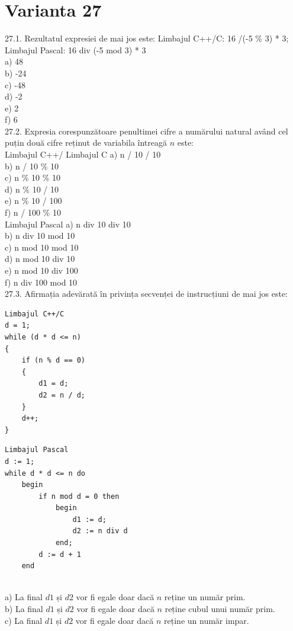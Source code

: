 \section*{Varianta 27}

27.1. Rezultatul expresiei de mai jos este: Limbajul C++/C: 16 /(-5 \% 3) * 3; Limbajul Pascal: 16 div (-5 mod 3) * 3
\\
a) 48
\\
b) -24
\\
c) -48
\\
d) -2
\\
e) 2
\\
f) 6
\\
27.2. Expresia corespunzătoare penultimei cifre a numărului natural având cel puțin două cifre reținut de variabila întreagă $n$ este:
\\
Limbajul C++/ Limbajul C
a) n / 10 / 10
\\
b) n / 10 \% 10
\\
c) n \% 10 \% 10
\\
d) n \% 10 / 10
\\
e) n \% 10 / 100
\\
f) n / 100 \% 10
\\
Limbajul Pascal
a) n div 10 div 10
\\
b) n div 10 mod 10
\\
c) n mod 10 mod 10
\\
d) n mod 10 div 10
\\
e) n mod 10 div 100
\\
f) n div 100 mod 10
\\
27.3. Afirmația adevărată în privința secvenței de instrucțiuni de mai jos este:
\begin{verbatim}
Limbajul C++/C
d = 1;
while (d * d <= n)
{
    if (n % d == 0)
    {
        d1 = d;
        d2 = n / d;
    }
    d++;
}
\end{verbatim}
\begin{verbatim}
Limbajul Pascal
d := 1;
while d * d <= n do
    begin
        if n mod d = 0 then
            begin
                d1 := d;
                d2 := n div d
            end;
        d := d + 1
    end
\end{verbatim}
\\
a) La final $d1$ și $d2$ vor fi egale doar dacă $n$ reține un număr prim.
\\
b) La final $d1$ și $d2$ vor fi egale doar dacă $n$ reține cubul unui număr prim.
\\
c) La final $d1$ și $d2$ vor fi egale doar dacă $n$ reține un număr impar.
